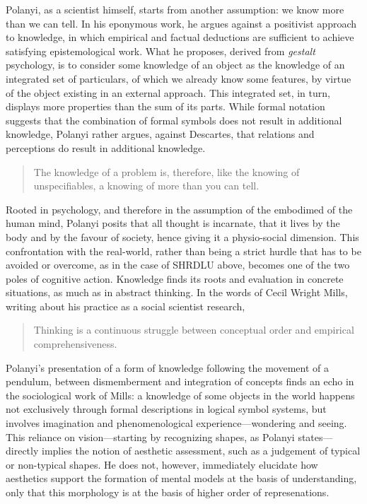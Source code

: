 Polanyi, as a scientist himself, starts from another assumption: we know more than we can tell. In his eponymous work, he argues against a positivist approach to knowledge, in which empirical and factual deductions are sufficient to achieve satisfying epistemological work. What he proposes, derived from \emph{gestalt} psychology, is to consider some knowledge of an object as the knowledge of an integrated set of particulars, of which we already know some features, by virtue of the object existing in an external approach. This integrated set, in turn, displays more properties than the sum of its parts. While formal notation suggests that the combination of formal symbols does not result in additional knowledge, Polanyi rather argues, against Descartes, that relations and perceptions do result in additional knowledge.

\begin{quote}
    The knowledge of a problem is, therefore, like the knowing of unspecifiables, a knowing of more than you can tell. \citep{polanyi_knowing_1969}
\end{quote}

Rooted in psychology, and therefore in the assumption of the embodimed of the human mind, Polanyi posits that all thought is incarnate, that it lives by the body and by the favour of society, hence giving it a physio-social dimension. This confrontation with the real-world, rather than being a strict hurdle that has to be avoided or overcome, as in the case of SHRDLU above, becomes one of the two poles of cognitive action. Knowledge finds its roots and evaluation in concrete situations, as much as in abstract thinking. In the words of Cecil Wright Mills, writing about his practice as a social scientist research,

\begin{quote}
    Thinking is a continuous struggle between conceptual order and empirical comprehensiveness. \citep{MillsC.WrightCharlesWright2000Tsi}
\end{quote}

Polanyi's presentation of a form of knowledge following the movement of a pendulum, between dismemberment and integration of concepts finds an echo in the sociological work of Mills: a knowledge of some objects in the world happens not exclusively through formal descriptions in logical symbol systems, but involves imagination and phenomenological experience—wondering and seeing. This reliance on vision—starting by recognizing shapes, as Polanyi states—directly implies the notion of aesthetic assessment, such as a judgement of typical or non-typical shapes. He does not, however, immediately elucidate how aesthetics support the formation of mental models at the basis of understanding, only that this morphology is at the basis of higher order of represenations.

